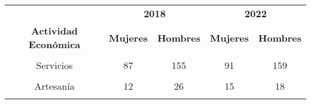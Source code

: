 \begin{tabular}[t]{ccccc}
\toprule
\multicolumn{1}{c}{\textbf{ }} & \multicolumn{2}{c}{\textbf{2018}} & \multicolumn{2}{c}{\textbf{2022}} \\
\cmidrule(l{3pt}r{3pt}){2-3} \cmidrule(l{3pt}r{3pt}){4-5}
\textbf{Actividad Económica} & \textbf{Mujeres} & \textbf{Hombres} & \textbf{Mujeres} & \textbf{Hombres}\\
\midrule
\cellcolor[HTML]{B6B3FF}{Comercio} & \cellcolor[HTML]{B6B3FF}{865} & \cellcolor[HTML]{B6B3FF}{1,050} & \cellcolor[HTML]{B6B3FF}{640} & \cellcolor[HTML]{B6B3FF}{836}\\
Servicios & 87 & 155 & 91 & 159\\
\cellcolor[HTML]{B6B3FF}{Industria} & \cellcolor[HTML]{B6B3FF}{31} & \cellcolor[HTML]{B6B3FF}{52} & \cellcolor[HTML]{B6B3FF}{9} & \cellcolor[HTML]{B6B3FF}{30}\\
Artesanía & 12 & 26 & 15 & 18\\
\cellcolor[HTML]{B6B3FF}{Agroindustria} & \cellcolor[HTML]{B6B3FF}{5} & \cellcolor[HTML]{B6B3FF}{5} & \cellcolor[HTML]{B6B3FF}{11} & \cellcolor[HTML]{B6B3FF}{14}\\
\bottomrule
\end{tabular}
